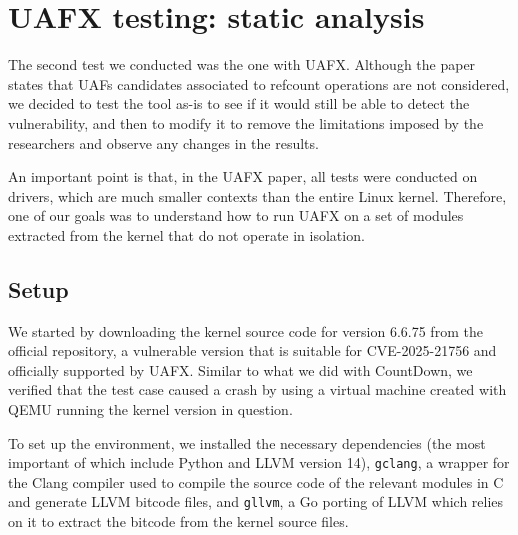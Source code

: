 \chapter{UAFX testing: static analysis}

The second test we conducted was the one with UAFX. Although the paper \cite{bib:uafx} states that UAFs candidates associated to refcount operations are not considered, we decided to test the tool as-is to see if it would still be able to detect the vulnerability, and then to modify it to remove the limitations imposed by the researchers and observe any changes in the results.

An important point is that, in the UAFX paper, all tests were conducted on drivers, which are much smaller contexts than the entire Linux kernel. Therefore, one of our goals was to understand how to run UAFX on a set of modules extracted from the kernel that do not operate in isolation.

\section{Setup}
We started by downloading the kernel source code for version 6.6.75 from the official repository, a vulnerable version that is suitable for CVE-2025-21756 and officially supported by UAFX. Similar to what we did with CountDown, we verified that the test case caused a crash by using a virtual machine created with QEMU running the kernel version in question.

To set up the environment, we installed the necessary dependencies (the most important of which include Python and LLVM version 14), \texttt{gclang}, a wrapper for the Clang compiler used to compile the source code of the relevant modules in C and generate LLVM bitcode files, and \texttt{gllvm}, a Go porting of LLVM which relies on it to extract the bitcode from the kernel source files.

